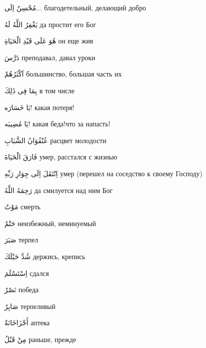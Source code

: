 \documentclass[a5paper]{article}
\newcommand\textstyleDropCaps[1]{#1}
\newcommand\textstyleCaptioncharacters[1]{#1}
\begin{document}
\textstyleCaptioncharacters{مُحْسِنٌ اِلَى... }\textstyleDropCaps{благоде­тельный, делающий добро‎}

\textstyleCaptioncharacters{يَغْفِرُ اللَّهُ لَهُ }\textstyleDropCaps{да простит его Бог‎}

\textstyleCaptioncharacters{هُوَ عَلَى قَيْدِ الْحَيَاةِ }\textstyleDropCaps{он еще жив‎}

\textstyleCaptioncharacters{دَرَّسَ }\textstyleDropCaps{преподавал, давал уроки‎}

\textstyleCaptioncharacters{اَكْثَرُهُمْ }\textstyleDropCaps{большинство, большая часть их‎}

\textstyleCaptioncharacters{بِمَا فِى ذَلِكَ }\textstyleDropCaps{в том числе‎}

\textstyleCaptioncharacters{يَا خَسَارَه!ِ }\textstyleDropCaps{какая потеря!‎}

\textstyleCaptioncharacters{يَا مُصِيبَه!ِ }\textstyleDropCaps{какая беда!что за напасть!‎}

\textstyleCaptioncharacters{عُنْفُوَانُ الشَّبَابِ }\textstyleDropCaps{рас­цвет молодости‎}

\textstyleCaptioncharacters{فَارَقَ الْحَيَاةَ }\textstyleDropCaps{умер, расстался с жизнью‎}

\textstyleCaptioncharacters{اِنْتَقَلَ اِلَى جِوَارِ رَبِّهِ }\textstyleDropCaps{умер (перешел на соседство к своему Господу)‎}

\textstyleCaptioncharacters{رَحِمَهُ اللَّهُ }\textstyleDropCaps{да смилуется над ним Бог‎}

\textstyleCaptioncharacters{مَوْتٌ }\textstyleDropCaps{смерть‎}

\textstyleCaptioncharacters{حَتْمٌ }\textstyleDropCaps{неизбежный, неми­нуемый‎}

\textstyleCaptioncharacters{صَبَرَ }\textstyleDropCaps{терпел‎}

\textstyleCaptioncharacters{شُدَّ حَيْلَكَ }\textstyleDropCaps{держись, кре­пись‎}

\textstyleCaptioncharacters{اِسْتَسْلَمَ }\textstyleDropCaps{сдался‎}

\textstyleCaptioncharacters{نَصْرٌ }\textstyleDropCaps{победа‎}

\textstyleCaptioncharacters{صَابِرٌ }\textstyleDropCaps{терпеливый‎}

\textstyleCaptioncharacters{أَجْزَاخَانَةٌ }\textstyleDropCaps{аптека‎}

\textstyleCaptioncharacters{مِنْ قَبْلُ }\textstyleDropCaps{раньше, прежде‎}
\end{document}
